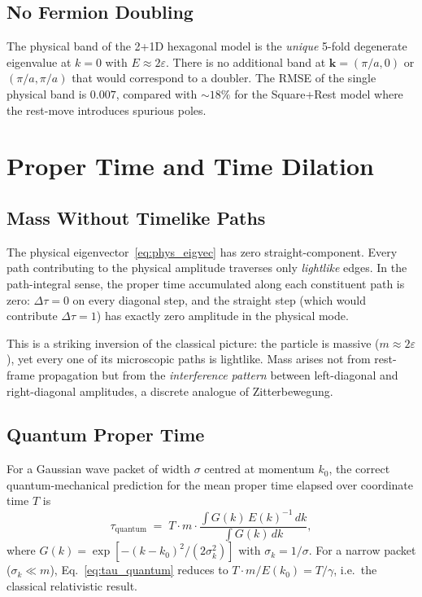 \documentclass[twocolumn,showpacs,preprintnumbers,amsmath,amssymb]{revtex4-2}
\newcommand{\eps}{\varepsilon}
\newcommand{\tauq}{\tau_{\mathrm{quantum}}}
\begin{document}
\subsection{No Fermion Doubling}

The physical band of the 2+1D hexagonal model is the \emph{unique} 5-fold
degenerate eigenvalue at $k=0$ with $E \approx 2\eps$.
There is no additional band at $\mathbf{k} = (\pi/a, 0)$ or
$(\pi/a, \pi/a)$ that would correspond to a doubler.
The RMSE of the single physical band is $0.007$, compared with $\sim 18\%$
for the Square+Rest model where the rest-move introduces spurious poles.


\section{Proper Time and Time Dilation}
\label{sec:propertime}

\subsection{Mass Without Timelike Paths}

The physical eigenvector~\eqref{eq:phys_eigvec} has zero straight-component.
Every path contributing to the physical amplitude traverses only
\emph{lightlike} edges.
In the path-integral sense, the proper time accumulated along each constituent
path is zero: $\Delta\tau = 0$ on every diagonal step, and the straight step
(which would contribute $\Delta\tau = 1$) has exactly zero amplitude in the
physical mode.

This is a striking inversion of the classical picture: the particle is massive
($m \approx 2\eps$), yet every one of its microscopic paths is lightlike.
Mass arises not from rest-frame propagation but from the \emph{interference
pattern} between left-diagonal and right-diagonal amplitudes, a discrete
analogue of Zitterbewegung.

\subsection{Quantum Proper Time}

For a Gaussian wave packet of width $\sigma$ centred at momentum $k_0$, the
correct quantum-mechanical prediction for the mean proper time elapsed over
coordinate time $T$ is
\begin{equation}
  \tauq \;=\; T \cdot m \cdot
    \frac{\displaystyle\int G(k)\,E(k)^{-1}\,dk}
         {\displaystyle\int G(k)\,dk},
  \label{eq:tau_quantum}
\end{equation}
where $G(k) = \exp[{-(k-k_0)^2/(2\sigma_k^2)}]$ with
$\sigma_k = 1/\sigma$.
For a narrow packet ($\sigma_k \ll m$),
Eq.~\eqref{eq:tau_quantum} reduces to $T \cdot m / E(k_0) = T/\gamma$,
i.e.\ the classical relativistic result.
\end{document}
